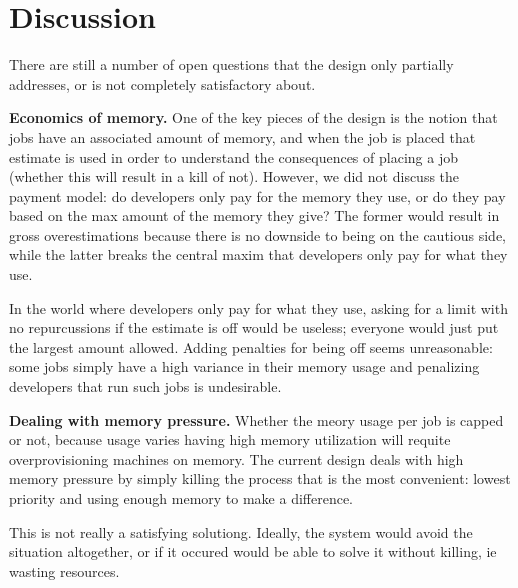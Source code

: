 \section{Discussion}



There are still a number of open questions that the design only partially addresses, or
is not completely satisfactory about.

\textbf{Economics of memory.}
One of the key pieces of the design is the notion that jobs have an associated
amount of memory, and when the job is placed that estimate is used in order to
understand the consequences of placing a job (whether this will result in a kill
of not). However, we did not discuss the payment model: do developers only pay
for the memory they use, or do they pay based on the max amount of the memory
they give? The former would result in gross overestimations because there is no
downside to being on the cautious side, while the latter breaks the central
maxim that developers only pay for what they use.

In the world where developers only pay for what they use, asking for a limit
with no repurcussions if the estimate is off would be useless; everyone would
just put the largest amount allowed. Adding penalties for being off seems
unreasonable: some jobs simply have a high variance in their memory usage and
penalizing developers that run such jobs is undesirable.

\textbf{Dealing with memory pressure.}
Whether the meory usage per job is capped or not, because usage varies having
high memory utilization will requite overprovisioning machines on memory. The
current design deals with high memory pressure by simply killing the process
that is the most convenient: lowest priority and using enough memory to make a
difference.

This is not really a satisfying solutiong. Ideally, the system would avoid the
situation altogether, or if it occured would be able to solve it without
killing, ie wasting resources. 

